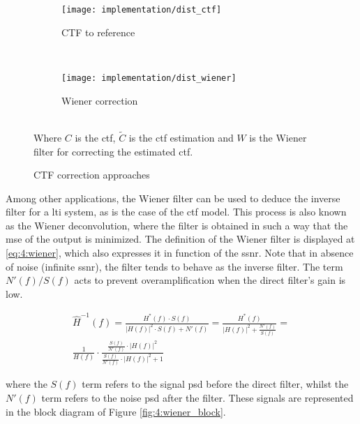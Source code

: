 \documentclass[../main.tex]{subfiles}
\begin{document}
\begin{figure}[htbp]
    \centering
    \begin{subfigure}[b]{\textwidth}
         \centering
         \texttt{[image: implementation/dist\_ctf]}
         \caption{CTF to reference}
         \label{fig:4:wiener:ctf}
    \end{subfigure}\\
    \vspace{2em}
    \begin{subfigure}[b]{\textwidth}
         \centering
         \texttt{[image: implementation/dist\_wiener]}
         \caption{Wiener correction}
         \label{fig:4:wiener:wiener}
    \end{subfigure}\\
    Where $C$ is the \gls{ctf}, $\tilde{C}$ is the \gls{ctf} estimation and $W$ is the Wiener filter for correcting the estimated \gls{ctf}.
    \caption{CTF correction approaches}
    \label{fig:4:wiener}
\end{figure}

Among other applications, the Wiener filter can be used to deduce the inverse filter for a \gls{lti} system, as is the case of the \gls{ctf} model. This process is also known as the Wiener deconvolution, where the filter is obtained in such a way that the \gls{mse} of the output is minimized\cite{ronda2022}. The definition of the Wiener filter is displayed at \eqref{eq:4:wiener}, which also expresses it in function of the \gls{ssnr}. Note that in absence of noise (infinite \gls{ssnr}), the filter tends to behave as the inverse filter\cite{wetzstein2018}. The term $N'(f)/S(f)$ acts  to prevent overamplification when the direct filter's gain is low. 

\begin{equation}\label{eq:4:wiener}
\begin{split}
    \hat{H}^{-1}(f) = 
    \frac{H^*(f) \cdot S(f)}{\left\vert H(f) \right\vert^2 \cdot S(f) + N'(f)} = 
    \frac{H^*(f)}{\left\vert H(f) \right\vert^2 + \frac{N'(f)}{S(f)}} = \\
    \frac{1}{H(f)} \cdot \frac{\frac{S(f)}{N'(f)} \cdot \left\vert H(f) \right\vert^2}{\frac{S(f)}{N'(f)} \cdot \left\vert H(f) \right\vert^2 + 1}
\end{split}
\end{equation}

where the $S(f)$ term refers to the signal \gls{psd} before the direct filter, whilst the $N'(f)$ term refers to the noise \gls{psd} after the filter\cite{ronda2022}. These signals are represented in the block diagram of Figure \ref{fig:4:wiener_block}.
\end{document}
